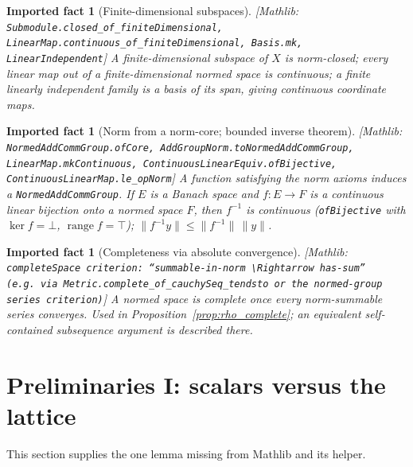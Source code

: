 \documentclass[11pt]{article}
\newcommand{\mlib}[1]{{\normalfont\scriptsize[\textsf{Mathlib:} \texttt{#1}]}}
\theoremstyle{definition}
\theoremstyle{plain}
\newtheorem{fact}[definition]{Imported fact}
\theoremstyle{remark}
\newcommand{\norm}[1]{\lVert #1\rVert}
\begin{document}
\begin{fact}[Finite-dimensional subspaces]\label{fact:findim}
\mlib{Submodule.closed\_of\_finiteDimensional, LinearMap.continuous\_of\_finiteDimensional, Basis.mk, LinearIndependent}
A finite-dimensional subspace of \(X\) is norm-closed; every linear map out of a
finite-dimensional normed space is continuous; a finite linearly independent
family is a basis of its span, giving continuous coordinate maps.
\end{fact}

\begin{fact}[Norm from a norm-core; bounded inverse theorem]\label{fact:banach}
\mlib{NormedAddCommGroup.ofCore, AddGroupNorm.toNormedAddCommGroup, LinearMap.mkContinuous, ContinuousLinearEquiv.ofBijective, ContinuousLinearMap.le\_opNorm}
A function satisfying the norm axioms induces a \texttt{NormedAddCommGroup}. If
\(E\) is a Banach space and \(f:E\to F\) is a continuous linear bijection onto a
normed space \(F\), then \(f^{-1}\) is continuous (\texttt{ofBijective} with
\(\ker f=\bot\), \(\operatorname{range}f=\top\)); \(\norm{f^{-1}y}\le\norm{f^{-1}}\,\norm{y}\).
\end{fact}

\begin{fact}[Completeness via absolute convergence]\label{fact:completecrit}
\mlib{completeSpace criterion: ``summable-in-norm $\Rightarrow$ has-sum'' (e.g.\ via \texttt{Metric.complete\_of\_cauchySeq\_tendsto} or the normed-group series criterion)}
A normed space is complete once every norm-summable series converges. Used in
Proposition~\ref{prop:rho_complete}; an equivalent self-contained subsequence
argument is described there.
\end{fact}

\section{Preliminaries I: scalars versus the lattice}\label{sec:scalars}

This section supplies the one lemma missing from Mathlib and its helper.
\end{document}
